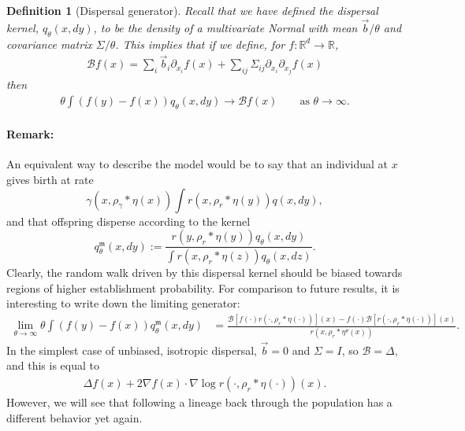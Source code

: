 \documentclass[12pt]{article}
\newtheorem{definition}[theorem]{Definition}
\newcommand{\IR}{\mathbb R}
\newcommand{\grad}{\nabla}
\newcommand{\DG}{\mathcal{B}}  %
\newcommand{\meanq}{\vec b}    %
\newcommand{\covq}{\Sigma}     %
\newcommand{\kernel}{\rho}  %
\newcommand{\smooth}[1]{\kernel_{#1} \! * \!}  %
\begin{document}
\begin{definition}[Dispersal generator]
    \label{def:dispersal_generator}
    Recall that we have defined the dispersal kernel,
    $q_\theta(x, dy)$,
    to be the density of a multivariate Normal
    with mean $\meanq/\theta$ and covariance matrix $\covq/\theta$.
    This implies that if we define, for $f : \IR^d \to \IR$,
    \begin{align}
    \DG f(x) = \sum_i \meanq_i \partial_{x_i} f(x)
        + \sum_{ij} \covq_{ij} \partial_{x_i} \partial_{x_j} f(x)
    \end{align}
    then
    \begin{align}
        \theta \int \left(
            f(y) - f(x)
        \right) q_\theta(x, dy)
    \to \DG f(x) 
        \qquad \text{as } \theta \to \infty .
    \end{align}
\end{definition}

\paragraph{Remark:}
An equivalent way to describe the model
would be to say that an individual at $x$ gives birth at rate
$$
    \gamma(x, \smooth{\gamma} \eta(x))
    \int r(x, \smooth{r} \eta(y)) q(x, dy) ,
$$
and that offspring disperse according to the kernel
$$
    q_\theta^\mathfrak{m}(x, dy)
    :=
    \frac{
        r(y, \smooth{r} \eta(y)) q_\theta(x, dy)
    }{
        \int r(x, \smooth{r} \eta(z)) q_\theta(x, dz)
    } .
$$
Clearly, the random walk driven by this dispersal kernel
should be biased towards regions of higher establishment probability.
For comparison to future results,
it is interesting to write down the limiting generator:
\begin{align*}
    \lim_{\theta \to \infty}
    \theta \int (f(y) - f(x)) q_\theta^\mathfrak{m}(x, dy)
    &=
    \frac{
        \DG\left[ f(\cdot) r(\cdot, \smooth{r} \eta(\cdot)) \right](x)
        - 
        f(\cdot) \DG\left[ r(\cdot, \smooth{r} \eta(\cdot)) \right](x)
    }{
        r(x, \smooth{r} \eta^{\theta}(x))
    } .
\end{align*}
In the simplest case of unbiased, isotropic dispersal,
$\meanq = 0$ and $\covq = I$, so $\DG = \Delta$,
and this is equal to
\begin{align*}
    \Delta f(x) + 2 \grad f(x) \cdot \grad \log r(\cdot, \smooth{r} \eta(\cdot))(x) .
\end{align*}
However, we will see that following a lineage back through the population
has a different behavior yet again.
\end{document}
